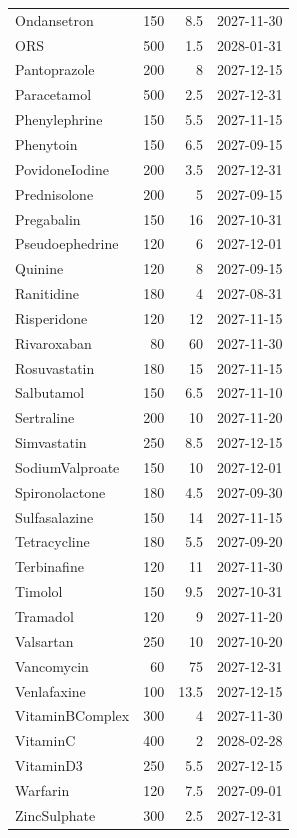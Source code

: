 \documentclass[12pt]{article}
\begin{document}
\begin{longtable}{lrrl}
Ondansetron & 150 & 8.5 & 2027-11-30 \\
ORS & 500 & 1.5 & 2028-01-31 \\
Pantoprazole & 200 & 8 & 2027-12-15 \\
Paracetamol & 500 & 2.5 & 2027-12-31 \\
Phenylephrine & 150 & 5.5 & 2027-11-15 \\
Phenytoin & 150 & 6.5 & 2027-09-15 \\
PovidoneIodine & 200 & 3.5 & 2027-12-31 \\
Prednisolone & 200 & 5 & 2027-09-15 \\
Pregabalin & 150 & 16 & 2027-10-31 \\
Pseudoephedrine & 120 & 6 & 2027-12-01 \\
Quinine & 120 & 8 & 2027-09-15 \\
Ranitidine & 180 & 4 & 2027-08-31 \\
Risperidone & 120 & 12 & 2027-11-15 \\
Rivaroxaban & 80 & 60 & 2027-11-30 \\
Rosuvastatin & 180 & 15 & 2027-11-15 \\
Salbutamol & 150 & 6.5 & 2027-11-10 \\
Sertraline & 200 & 10 & 2027-11-20 \\
Simvastatin & 250 & 8.5 & 2027-12-15 \\
SodiumValproate & 150 & 10 & 2027-12-01 \\
Spironolactone & 180 & 4.5 & 2027-09-30 \\
Sulfasalazine & 150 & 14 & 2027-11-15 \\
Tetracycline & 180 & 5.5 & 2027-09-20 \\
Terbinafine & 120 & 11 & 2027-11-30 \\
Timolol & 150 & 9.5 & 2027-10-31 \\
Tramadol & 120 & 9 & 2027-11-20 \\
Valsartan & 250 & 10 & 2027-10-20 \\
Vancomycin & 60 & 75 & 2027-12-31 \\
Venlafaxine & 100 & 13.5 & 2027-12-15 \\
VitaminBComplex & 300 & 4 & 2027-11-30 \\
VitaminC & 400 & 2 & 2028-02-28 \\
VitaminD3 & 250 & 5.5 & 2027-12-15 \\
Warfarin & 120 & 7.5 & 2027-09-01 \\
ZincSulphate & 300 & 2.5 & 2027-12-31 \\

\bottomrule
\end{longtable}
\end{document}
